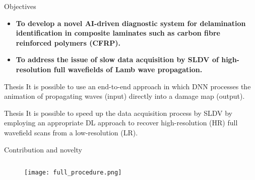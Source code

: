 \documentclass[10pt,aspectratio=169,dvipsnames]{beamer} %
\begin{document}
	\begin{frame}{Objectives}
		\begin{footnotesize}
			\begin{itemize}
				\item \textbf{To develop \textcolor{logoblue}{a novel AI-driven diagnostic system} for delamination identification in composite laminates such as carbon fibre reinforced polymers (CFRP).}
				\item \textbf{To address the issue of \textcolor{logoblue}{slow data acquisition} by SLDV of high-resolution full wavefields of Lamb wave propagation.}
			\end{itemize}
		\end{footnotesize}		
		\begin{tcolorbox}
			\begin{alertblock}{Thesis}
				It is possible to use an end-to-end approach in which DNN 
				processes the animation of propagating waves (input) directly into a damage map (output).
			\end{alertblock}
			\begin{alertblock}{Thesis}
				It is possible to speed up the data acquisition process by SLDV by employing an appropriate DL approach to recover high-resolution (HR) full wavefield scans  from a low-resolution (LR).
			\end{alertblock}
		\end{tcolorbox}		
	\end{frame}
	\begin{frame}{Contribution and novelty}
		\begin{columns}[T]
			\begin{column}[c]{0.95\textwidth}
				\begin{figure}
					\centering
					\texttt{[image: full\_procedure.png]}	
				\end{figure}		
			\end{column}
		\end{columns}		
	\end{frame}
\end{document}
